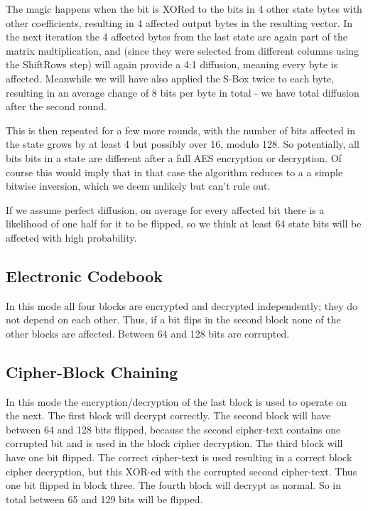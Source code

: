 \documentclass{article}
\begin{document}
The magic happens when the bit is XORed to the bits in 4 other state bytes with other coefficients, resulting in 4 affected output bytes in the resulting vector.
In the next iteration the 4 affected bytes from the last state are again part of the matrix multiplication, and (since they were selected from different columns using the ShiftRows step) will again provide a 4:1 diffusion, meaning every byte is affected.
Meanwhile we will have also applied the S-Box twice to each byte, resulting in an average change of 8 bits per byte in total - we have total diffusion after the second round.

This is then repeated for a few more rounds, with the number of bits affected in the state grows by at least 4 but possibly over 16, modulo 128.
So potentially, all bits bits in a state are different after a full AES encryption or decryption.
Of course this would imply that in that case the algorithm reduces to a a simple bitwise inversion, which we deem unlikely but can't rule out.

If we assume perfect diffusion, on average for every affected bit there is a likelihood of one half for it to be flipped, so we think at least 64 state bits will be affected with high probability.


\subsection{Electronic Codebook}
In this mode all four blocks are encrypted and decrypted independently; they do not depend on each other.
Thus, if a bit flips in the second block none of the other blocks are affected.
Between 64 and 128 bits are corrupted.


\subsection{Cipher-Block Chaining}
In this mode the encryption/decryption of the last block is used to operate on the next.
The first block will decrypt correctly. The second block will have between 64 and 128 bits flipped, because the second cipher-text contains one corrupted bit and is used in the block cipher decryption. The third block will have one bit flipped. The correct cipher-text is used resulting in a correct block cipher decryption, but this XOR-ed with the corrupted second cipher-text. Thus one bit flipped in block three. The fourth block will decrypt as normal.
So in total between 65 and 129 bits will be flipped.
\end{document}
